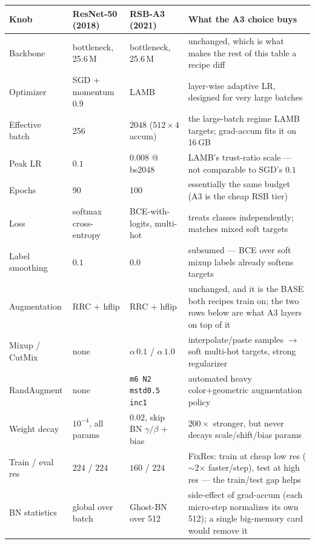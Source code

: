 \begin{center}
\begin{tabular}{@{}l p{2.9cm} p{3.2cm} p{6.3cm}@{}}
\hline
Knob & ResNet-50 (2018) & RSB-A3 (2021) & What the A3 choice buys \\
\hline
Backbone      & bottleneck, 25.6\,M    & bottleneck, 25.6\,M          & unchanged, which is what makes the rest of this table a recipe diff \\
Optimizer     & SGD + momentum $0.9$   & LAMB                          & layer-wise adaptive LR, designed for very large batches \\
Effective batch & 256                  & 2048 ($512\times4$ accum)     & the large-batch regime LAMB targets; grad-accum fits it on 16\,GB \\
Peak LR       & $0.1$                  & $0.008$ @ bs2048              & LAMB's trust-ratio scale --- not comparable to SGD's $0.1$ \\
Epochs        & 90                     & 100                           & essentially the same budget (A3 is the cheap RSB tier) \\
Loss          & softmax cross-entropy  & BCE-with-logits, multi-hot    & treats classes independently; matches mixed soft targets \\
Label smoothing & $0.1$                & $0.0$                         & subsumed --- BCE over soft mixup labels already softens targets \\
Augmentation  & RRC + hflip            & RRC + hflip                   & unchanged, and it is the BASE both recipes train on; the two rows below are what A3 layers on top of it \\
Mixup / CutMix & none                  & $\alpha\,0.1$ / $\alpha\,1.0$ & interpolate/paste samples $\to$ soft multi-hot targets, strong regularizer \\
RandAugment   & none                   & \texttt{m6 N2 mstd0.5 inc1}   & automated heavy color+geometric augmentation policy \\
Weight decay  & $10^{-4}$, all params  & $0.02$, skip BN $\gamma/\beta$ + bias & $200\times$ stronger, but never decays scale/shift/bias params \\
Train / eval res & $224$ / $224$        & $160$ / $224$                 & FixRes: train at cheap low res ($\sim$2$\times$ faster/step), test at high res --- the train/test gap helps \\
BN statistics & global over batch      & Ghost-BN over 512             & side-effect of grad-accum (each micro-step normalizes its own 512); a single big-memory card would remove it \\
\hline
\end{tabular}
\end{center}

